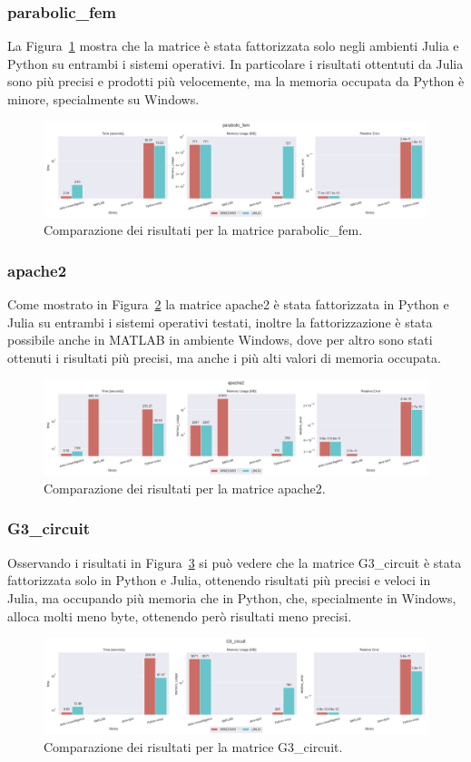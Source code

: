 \documentclass[a4paper, 12pt]{article}
\begin{document}
\subsubsection{parabolic\_fem}
La Figura~\ref{fig:parabolic_fem} mostra che la matrice è stata fattorizzata
solo negli ambienti Julia e Python su entrambi i sistemi operativi.
In particolare i risultati ottentuti da Julia sono più precisi e prodotti più
velocemente, ma la memoria occupata da Python è minore, specialmente su Windows.
\begin{figure}[ht]
\includegraphics[width=\textwidth]{parabolic_fem}
\caption{Comparazione dei risultati per la matrice parabolic\_fem.}
\label{fig:parabolic_fem}
\end{figure}
\subsubsection{apache2}
Come mostrato in Figura~\ref{fig:apache2} la matrice apache2 è stata
fattorizzata in Python e Julia su entrambi i sistemi operativi testati, inoltre
la fattorizzazione è stata possibile anche in MATLAB in ambiente Windows, dove
per altro sono stati ottenuti i risultati più precisi, ma anche i più alti
valori di memoria occupata.
\begin{figure}[ht]
\includegraphics[width=\textwidth]{apache2}
\caption{Comparazione dei risultati per la matrice apache2.}
\label{fig:apache2}
\end{figure}
\subsubsection{G3\_circuit}
Osservando i risultati in Figura~\ref{fig:G3_circuit} si può vedere che la
matrice G3\_circuit è stata fattorizzata solo in Python e Julia, ottenendo
risultati più precisi e veloci in Julia, ma occupando più memoria che in Python,
che, specialmente in Windows, alloca molti meno byte, ottenendo però risultati
meno precisi.
\begin{figure}[ht]
\includegraphics[width=\textwidth]{G3_circuit}
\caption{Comparazione dei risultati per la matrice G3\_circuit.}
\label{fig:G3_circuit}
\end{figure}
\end{document}
